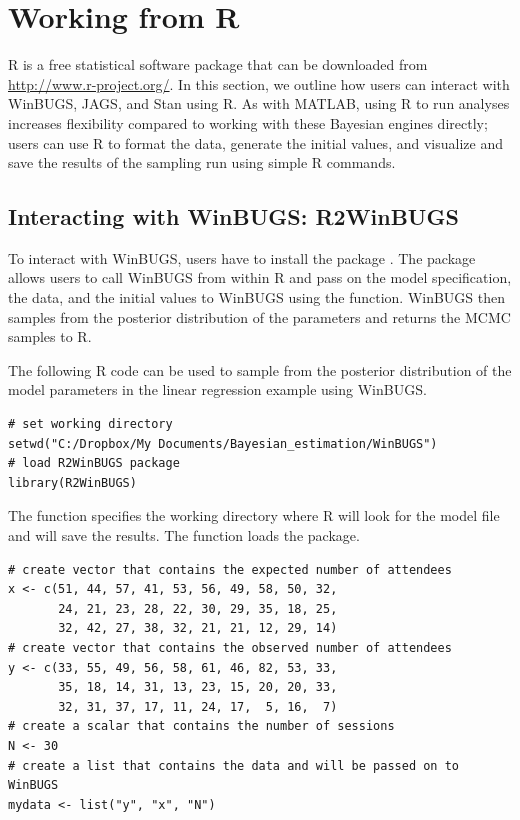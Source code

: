 \section{Working from R}

R \cite{R} is a free statistical software package that can be downloaded from \url{http://www.r-project.org/}. In this section, we outline how users can interact with WinBUGS, JAGS, and Stan using R. As with MATLAB, using R to run analyses increases flexibility compared to working with these Bayesian engines directly; users can use R to format the data, generate the initial values, and visualize and save the results of the sampling run using simple R commands.

\subsection{Interacting with WinBUGS: R2WinBUGS}

To interact with WinBUGS, users have to install the  package \cite{SturtzEtAl2005}. The  package allows users to call WinBUGS from within R and pass on the model specification, the data, and the initial values to WinBUGS using the  function. WinBUGS then samples from the posterior distribution of the parameters and returns the MCMC samples to R. 

The following R code can be used to sample from the posterior distribution of the model parameters in the linear regression example using WinBUGS. 

\begin{lstlisting}
# set working directory
setwd("C:/Dropbox/My Documents/Bayesian_estimation/WinBUGS")
# load R2WinBUGS package
library(R2WinBUGS)
\end{lstlisting}

\noindent The  function specifies the working directory where R will look for the model file and will save the results. The  function loads the  package.

\begin{lstlisting}
# create vector that contains the expected number of attendees
x <- c(51, 44, 57, 41, 53, 56, 49, 58, 50, 32,
       24, 21, 23, 28, 22, 30, 29, 35, 18, 25,
       32, 42, 27, 38, 32, 21, 21, 12, 29, 14)
# create vector that contains the observed number of attendees
y <- c(33, 55, 49, 56, 58, 61, 46, 82, 53, 33,
       35, 18, 14, 31, 13, 23, 15, 20, 20, 33,
       32, 31, 37, 17, 11, 24, 17,  5, 16,  7)
# create a scalar that contains the number of sessions
N <- 30
# create a list that contains the data and will be passed on to WinBUGS
mydata <- list("y", "x", "N") 
\end{lstlisting}

